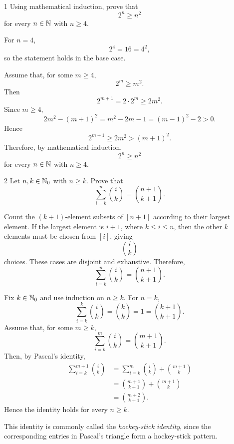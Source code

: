 \documentclass[11pt,oneside]{article}
\begin{document}


\begin{problem}{1}
Using mathematical induction, prove that
\[
    2^n\geq n^2
\]
for every $n\in\mathbb{N}$ with $n\geq4$.
\end{problem}

\begin{solution}
For $n=4$,
\[
    2^4=16=4^2,
\]
so the statement holds in the base case.

Assume that, for some $m\geq4$,
\[
    2^m\geq m^2.
\]
Then
\[
    2^{m+1}=2\cdot2^m\geq2m^2.
\]
Since $m\geq4$,
\[
    2m^2-(m+1)^2
    =m^2-2m-1
    =(m-1)^2-2>0.
\]
Hence
\[
    2^{m+1}\geq2m^2>(m+1)^2.
\]
Therefore, by mathematical induction,
\[
    2^n\geq n^2
\]
for every $n\in\mathbb{N}$ with $n\geq4$.
\end{solution}

\begin{problem}{2}
Let $n,k\in\mathbb{N}_0$ with $n\geq k$. Prove that
\[
    \sum_{i=k}^{n}\binom{i}{k}
    =\binom{n+1}{k+1}.
\]
\end{problem}

\begin{solution}[1]
Count the $(k+1)$-element subsets of $[n+1]$ according to their largest element. If the largest element is $i+1$, where $k\leq i\leq n$, then the other $k$ elements must be chosen from $[i]$, giving
\[
    \binom{i}{k}
\]
choices. These cases are disjoint and exhaustive. Therefore,
\[
    \sum_{i=k}^{n}\binom{i}{k}
    =\binom{n+1}{k+1}.
\]
\end{solution}

\begin{solution}[2]
Fix $k\in\mathbb{N}_0$ and use induction on $n\geq k$. For $n=k$,
\[
    \sum_{i=k}^{k}\binom{i}{k}
    =\binom{k}{k}
    =1
    =\binom{k+1}{k+1}.
\]
Assume that, for some $m\geq k$,
\[
    \sum_{i=k}^{m}\binom{i}{k}
    =\binom{m+1}{k+1}.
\]
Then, by Pascal's identity,
\[
\begin{aligned}
    \sum_{i=k}^{m+1}\binom{i}{k}
    &=\sum_{i=k}^{m}\binom{i}{k}+\binom{m+1}{k}\\
    &=\binom{m+1}{k+1}+\binom{m+1}{k}\\
    &=\binom{m+2}{k+1}.
\end{aligned}
\]
Hence the identity holds for every $n\geq k$.
\end{solution}

\begin{remark}
This identity is commonly called the \emph{hockey-stick identity}, since the corresponding entries in Pascal's triangle form a hockey-stick pattern.
\end{remark}
\end{document}
